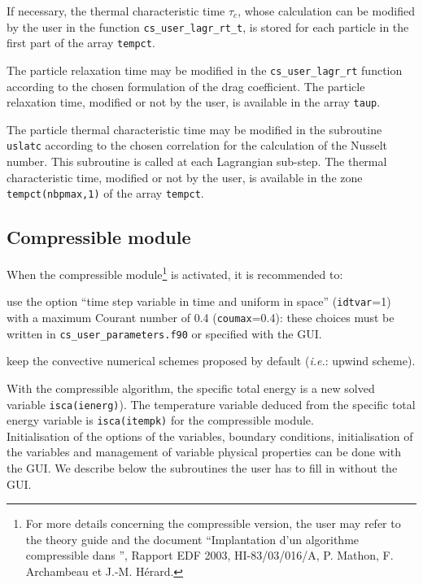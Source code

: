 {{{\noindent
If necessary, the thermal characteristic time $\tau_c$, whose calculation can be modified by the user in the function
\texttt{cs\_user\_lagr\_rt\_t}, is stored for each particle in the first part of the array \texttt{tempct}.


\noindent
The particle relaxation time may be modified in the \texttt{cs\_user\_lagr\_rt} function according to the chosen formulation of the drag coefficient. The particle relaxation time, modified or not by the user, is available in the array \texttt{taup}.


\noindent
The particle thermal characteristic time may be modified in the subroutine \texttt{uslatc} according to the chosen correlation for the calculation of the
Nusselt number. This subroutine is called at each Lagrangian sub-step. The thermal characteristic time, modified or not by the user, is available in the zone \texttt{tempct(nbpmax,1)} of the array \texttt{tempct}.


\subsection{Compressible module}

When the compressible module\footnote{For more details concerning the
compressible version, the user may refer to the theory guide \cite{theory} and the document ``Implantation
d'un algorithme compressible dans \CS'', Rapport EDF 2003,
HI-83/03/016/A, P. Mathon, F. Archambeau et J.-M. H\'erard.} is
activated, it is recommended to:
\begin{list}{-}{}
 \item use the option ``time step variable in time and uniform in
       space'' (\texttt{idtvar}=1) with a maximum Courant number of 0.4
       (\texttt{coumax}=0.4): these choices must be written in \texttt{cs\_user\_parameters.f90}
       or specified with the GUI.
 \item keep the convective numerical schemes proposed by default (\textit{i.e.}: upwind scheme).
\end{list}
With the compressible algorithm, the specific total energy is a new solved variable
\texttt{isca(ienerg)}). The temperature variable deduced from the specific
total energy variable is \texttt{isca(itempk)} for the compressible module.\\
Initialisation of the options of the variables, boundary conditions, initialisation of the variables and
management of variable physical properties can be done with the GUI. We describe below the subroutines
the user has to fill in without the GUI.

}}}
